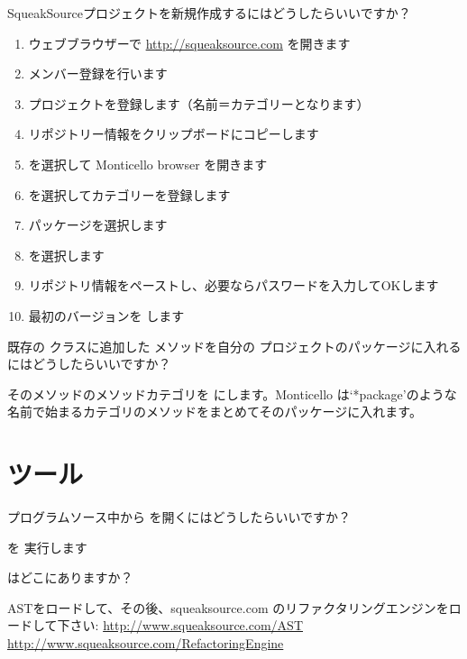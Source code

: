 \documentclass[a4paper,10pt,twoside]{book}
\begin{document}
\begin{faq}
SqueakSourceプロジェクトを新規作成するにはどうしたらいいですか？
\end{faq}
\answer
\begin{enumerate}
  \item ウェブブラウザーで \url{http://squeaksource.com} を開きます
  \item メンバー登録を行います
  \item プロジェクトを登録します（名前＝カテゴリーとなります）
  \item リポジトリー情報をクリップボードにコピーします
  \item {} を選択して Monticello browser を開きます
  \item {} を選択してカテゴリーを登録します
  \item パッケージを選択します
  \item {} を選択します
  \item リポジトリ情報をペーストし、必要ならパスワードを入力してOKします
  \item 最初のバージョンを  します
\end{enumerate}

\begin{faq}
既存の  クラスに追加した  メソッドを自分の  プロジェクトのパッケージに入れるにはどうしたらいいですか？
\end{faq}
\answer
そのメソッドのメソッドカテゴリを  にします。Monticello は‘*package’のような名前で始まるカテゴリのメソッドをまとめてそのパッケージに入れます。

\section{ツール}

\begin{faq}
プログラムソース中から   を開くにはどうしたらいいですか？
\end{faq}
\answer
  を 実行します

\begin{faq}
 はどこにありますか？ 
\end{faq}
\answer
ASTをロードして、その後、squeaksource.com のリファクタリングエンジンをロードして下さい:
\url{http://www.squeaksource.com/AST}
\url{http://www.squeaksource.com/RefactoringEngine}
\end{document}
